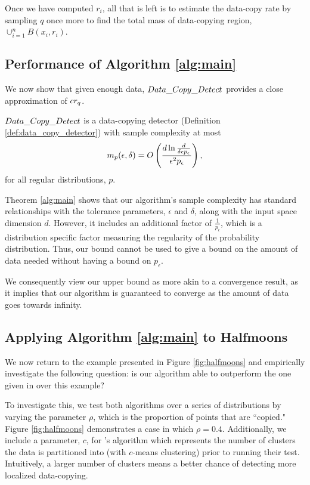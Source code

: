 Once we have computed $r_i$, all that is left is to estimate the data-copy rate by sampling $q$ once more to find the total mass of data-copying region, $\cup_{i=1}^n B(x_i, r_i)$. 

\subsection{Performance of Algorithm \ref{alg:main}}

We now show that given enough data, $Data\_Copy\_Detect{}$ provides a close approximation of $cr_q$. 

\begin{theorem}\label{thm:upper_bound5}
$Data\_Copy\_Detect{}$ is a data-copying detector (Definition \ref{def:data_copy_detector}) with sample complexity at most $$m_p(\epsilon, \delta) = O\left(\frac{d\ln\frac{d}{\delta\epsilon p_\epsilon}}{\epsilon^2 p_\epsilon}\right),$$ for all regular distributions, $p$. 
\end{theorem}

Theorem \ref{alg:main} shows that our algorithm's sample complexity has standard relationships with the tolerance parameters, $\epsilon$ and $\delta$, along with the input space dimension $d$. However, it includes an additional factor of $\frac{1}{p_\epsilon}$, which is a distribution specific factor measuring the regularity of the probability distribution. Thus, our bound cannot be used to give a bound on the amount of data needed without having a bound on $p_\epsilon$. 

We consequently view our upper bound as more akin to a convergence result, as it implies that our algorithm is guaranteed to converge as the amount of data goes towards infinity.

\subsection{Applying Algorithm \ref{alg:main} to Halfmoons}\label{sec:experiments}

We now return to the example presented in Figure \ref{fig:halfmoons} and empirically investigate the following question: is our algorithm able to outperform the one given in \cite{MCD2020} over this example? 

To investigate this, we test both algorithms over a series of distributions by varying the parameter $\rho$, which is the proportion of points that are ``copied." Figure \ref{fig:halfmoons} demonstrates a case in which $\rho = 0.4$. Additionally, we include a parameter, $c$, for \cite{MCD2020}'s algorithm which represents the number of clusters the data is partitioned into (with $c$-means clustering) prior to running their test. Intuitively, a larger number of clusters means a better chance of detecting more localized data-copying.

